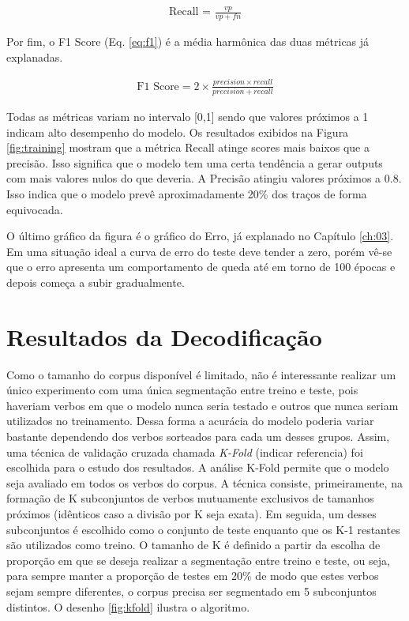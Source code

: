 \begin{align}\label{eq:recall}
\text{Recall = } \frac{vp}{vp + fn}
\end{align}

Por fim, o F1 Score (Eq. \ref{eq:f1}) é a média harmônica das duas métricas já explanadas.

\begin{center}
\begin{align}\label{eq:f1}
  \text{F1 Score} = 2 \times \frac{precision \times recall}{precision + recall}
  \end{align}
\end{center}

Todas as métricas variam no intervalo [0,1] sendo que valores próximos a 1 indicam alto desempenho do modelo.
Os resultados exibidos na Figura \ref{fig:training} mostram que a métrica Recall atinge scores mais baixos que a precisão. Isso significa que o modelo tem uma certa tendência a gerar outputs com mais valores nulos do que deveria. A Precisão atingiu valores próximos a 0.8. Isso indica que o modelo prevê aproximadamente 20\% dos traços de forma equivocada.

O último gráfico da figura é o gráfico do Erro, já explanado no Capítulo \ref{ch:03}. Em uma situação ideal a curva de erro do teste deve tender a zero, porém vê-se que o erro apresenta um comportamento de queda até em torno de 100 épocas e depois começa a subir gradualmente. 



\section{Resultados da Decodificação}
\label{sec:results}
Como o tamanho do corpus disponível é limitado, não é interessante realizar um único experimento com uma única segmentação entre treino e teste, pois haveriam verbos em que o modelo nunca seria testado e outros que nunca seriam utilizados no treinamento. Dessa forma a acurácia do modelo poderia variar bastante dependendo dos verbos sorteados para cada um desses grupos. Assim, uma técnica de validação cruzada chamada \textit{K-Fold} (indicar referencia) foi escolhida para o estudo dos resultados. A análise K-Fold permite que o modelo seja avaliado em todos os verbos do corpus. A técnica consiste, primeiramente, na formação de K subconjuntos de verbos mutuamente exclusivos de tamanhos próximos (idênticos caso a divisão por K seja exata). Em seguida, um desses subconjuntos é escolhido como o conjunto de teste enquanto que os K-1 restantes são utilizados como treino. O tamanho de K é definido a partir da escolha de proporção em que se deseja realizar a segmentação entre treino e teste, ou seja, para sempre manter a proporção de testes em 20\% de modo que estes verbos sejam sempre diferentes, o corpus precisa ser segmentado em 5 subconjuntos distintos. O desenho \ref{fig:kfold} ilustra o algoritmo. 

